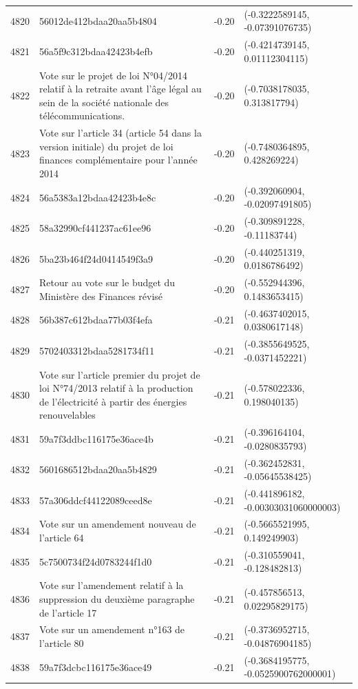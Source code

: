 \begin{table}[ht]
\begin{tabular}{rlrl}
  4820 & 56012de412bdaa20aa5b4804 & -0.20 & (-0.3222589145, -0.07391076735) \\ 
  4821 & 56a5f9c312bdaa42423b4efb & -0.20 & (-0.4214739145, 0.01112304115) \\ 
  4822 & Vote sur le projet de loi N°04/2014 relatif à la retraite avant l'âge légal au sein de la société nationale des télécommunications. & -0.20 & (-0.7038178035, 0.313817794) \\ 
  4823 & Vote sur l'article 34 (article 54 dans la version initiale) du projet de loi finances complémentaire pour l'année 2014 & -0.20 & (-0.7480364895, 0.428269224) \\ 
  4824 & 56a5383a12bdaa42423b4e8c & -0.20 & (-0.392060904, -0.02097491805) \\ 
  4825 & 58a32990cf441237ac61ee96 & -0.20 & (-0.309891228, -0.11183744) \\ 
  4826 & 5ba23b464f24d0414549f3a9 & -0.20 & (-0.440251319, 0.0186786492) \\ 
  4827 & Retour au vote sur le budget du Ministère des Finances révisé & -0.20 & (-0.552944396, 0.1483653415) \\ 
  4828 & 56b387c612bdaa77b03f4efa & -0.21 & (-0.4637402015, 0.0380617148) \\ 
  4829 & 5702403312bdaa5281734f11 & -0.21 & (-0.3855649525, -0.0371452221) \\ 
  4830 & Vote sur l'article premier du projet de loi N°74/2013 relatif à la production de l'électricité à partir des énergies renouvelables & -0.21 & (-0.578022336, 0.198040135) \\ 
  4831 & 59a7f3ddbc116175e36ace4b & -0.21 & (-0.396164104, -0.0280835793) \\ 
  4832 & 5601686512bdaa20aa5b4829 & -0.21 & (-0.362452831, -0.05645538425) \\ 
  4833 & 57a306ddcf44122089ceed8e & -0.21 & (-0.441896182, -0.00303031060000003) \\ 
  4834 & Vote sur un amendement nouveau de l'article 64 & -0.21 & (-0.5665521995, 0.149249903) \\ 
  4835 & 5c7500734f24d0783244f1d0 & -0.21 & (-0.310559041, -0.128482813) \\ 
  4836 & Vote sur l'amendement relatif à la suppression du deuxième paragraphe de l'article 17 & -0.21 & (-0.457856513, 0.02295829175) \\ 
  4837 & Vote sur un amendement n°163 de l'article 80 & -0.21 & (-0.3736952715, -0.04876904185) \\ 
  4838 & 59a7f3dcbc116175e36ace49 & -0.21 & (-0.3684195775, -0.0525900762000001) \\ 

\end{tabular}
\end{table}
